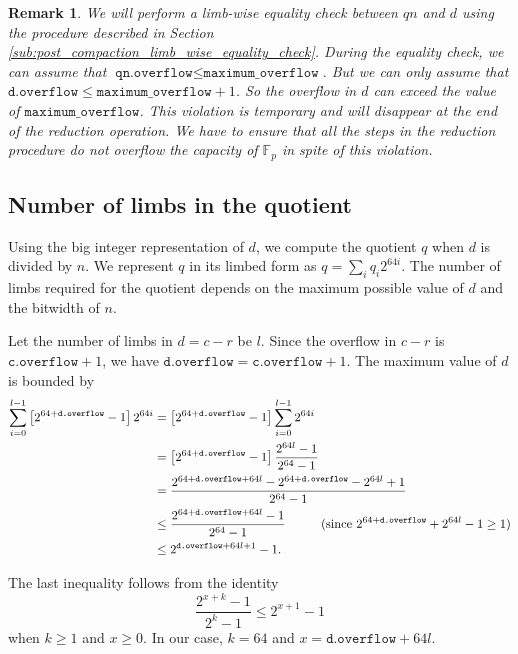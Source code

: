 \documentclass[a4paper, 12pt]{article}
\newtheorem*{remark}{Remark}
\begin{document}
\begin{remark}
  We will perform a limb-wise equality check between $qn$ and $d$ using the procedure described in Section \ref{sub:post_compaction_limb_wise_equality_check}. During the equality check, we can assume that $\texttt{qn.overflow} \le \texttt{maximum\_overflow}$. But we can only assume that $\texttt{d.overflow} \le \texttt{maximum\_overflow} + 1$. So the overflow in $d$ can exceed the value of $\texttt{maximum\_overflow}$. This violation is temporary and will disappear at the end of the reduction operation. We have to ensure that all the steps in the reduction procedure do not overflow the capacity of $\mathbb{F}_p$ in spite of this violation.
\end{remark}

\subsection{Number of limbs in the quotient}

Using the big integer representation of $d$, we compute the quotient $q$ when $d$ is divided by $n$. We represent $q$ in its limbed form as $q = \sum_{i} q_i 2^{64i}$. The number of limbs required for the quotient depends on the maximum possible value of $d$ and the bitwidth of $n$.

Let the number of limbs in $d = c-r$ be $l$. Since the overflow in $c-r$ is $\texttt{c.overflow}+1$, we have $\texttt{d.overflow} = \texttt{c.overflow}+1$. The maximum value of $d$ is bounded by 
\begin{align*}
\sum_{i=0}^{l-1} \left[2^{64 + \texttt{d.overflow}}-1\right]2^{64i} & = \left[2^{64 + \texttt{d.overflow}}-1\right]\sum_{i=0}^{l-1} 2^{64i} \\\
& =  \left[2^{64 + \texttt{d.overflow}}-1\right] \frac{2^{64l}-1}{2^{64}-1}\\
& = \frac{2^{64+\texttt{d.overflow}+64l}- 2^{64+\texttt{d.overflow}}-2^{64l} + 1}{2^{64}-1} \\
& \le \frac{2^{64+\texttt{d.overflow}+64l}-1}{2^{64}-1} \hspace{10mm} (\text{since } 2^{64 + \texttt{d.overflow}} + 2^{64l} - 1 \ge 1) \\
& \le 2^{\texttt{d.overflow} + 64l+1} -1.
\end{align*}
         
The last inequality follows from the identity 
$$\frac{2^{x+k}-1}{2^{k}-1} \le 2^{x+1}-1$$
when $k \ge 1$ and $x \ge 0$. In our case, $k=64$ and $x=\texttt{d.overflow}+64l$.
\end{document}
